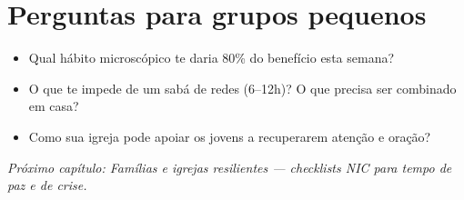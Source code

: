 \section{Perguntas para grupos pequenos}
\begin{itemize}[leftmargin=*,noitemsep]
  \item Qual hábito microscópico te daria 80\% do benefício esta semana?
  \item O que te impede de um sabá de redes (6--12h)? O que precisa ser combinado em casa?
  \item Como sua igreja pode apoiar os jovens a recuperarem atenção e oração?
\end{itemize}

\bigskip
\noindent\textit{Próximo capítulo: Famílias e igrejas resilientes --- checklists NIC para tempo de paz e de crise.}

